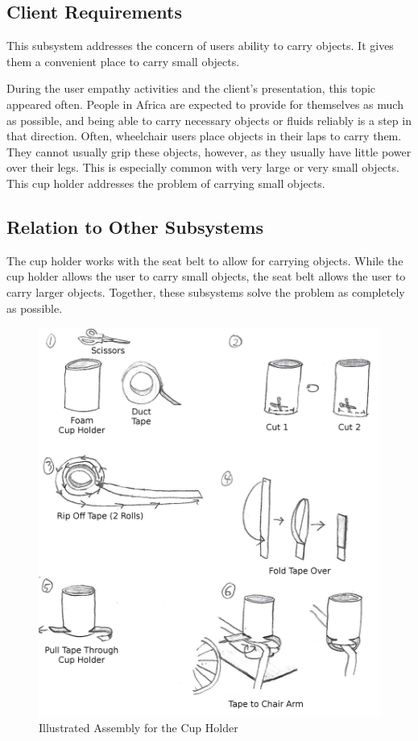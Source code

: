\subsection{Client Requirements}
This subsystem addresses the concern of users ability to carry objects. It
gives them a convenient place to carry small objects.

During the user empathy activities and the client's presentation, this
topic appeared often. People in Africa are expected to provide for
themselves as much as possible, and being able to carry necessary objects
or fluids reliably is a step in that direction. Often, wheelchair users
place objects in their laps to carry them. They cannot usually grip these
objects, however, as they usually have little power over their legs. This
is especially common with very large or very small objects. This cup holder
addresses the problem of carrying small objects.

\subsection{Relation to Other Subsystems}
The cup holder works with the seat belt to allow for carrying objects. While
the cup holder allows the user to carry small objects, the seat belt allows the
user to carry larger objects. Together, these subsystems solve the problem as
completely as possible.

\begin{figure}[H]
    \label{fig:cupholderasm}
    \includegraphics[width=\textwidth]{cupholderasm}
    \caption{Illustrated Assembly for the Cup Holder}
\end{figure}
